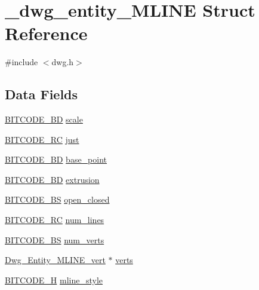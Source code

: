 \hypertarget{struct__dwg__entity__MLINE}{\section{\-\_\-dwg\-\_\-entity\-\_\-\-M\-L\-I\-N\-E \-Struct \-Reference}
\label{struct__dwg__entity__MLINE}
}


{\ttfamily \#include $<$dwg.\-h$>$}

\subsection*{\-Data \-Fields}
\begin{DoxyCompactItemize}
\item 
\hyperlink{dwg_8h_a3c1e6781466b74ba07785d57da70ed97}{\-B\-I\-T\-C\-O\-D\-E\-\_\-\-B\-D} \hyperlink{struct__dwg__entity__MLINE_a971b1dfcf5e832350da4a007ef904452}{scale}
\item 
\hyperlink{dwg_8h_a7fd199a8f9c9cc52bdab220f65a2a619}{\-B\-I\-T\-C\-O\-D\-E\-\_\-\-R\-C} \hyperlink{struct__dwg__entity__MLINE_abd3f0ce020f66391193d840428d8e27d}{just}
\item 
\hyperlink{dwg_8h_a00698ef1bb072aa0a9360c6fc1c57587}{\-B\-I\-T\-C\-O\-D\-E\-\_\-B\-D} \hyperlink{struct__dwg__entity__MLINE_ac2872d0d076c05fa4338e3d0d12509ea}{base\-\_\-point}
\item 
\hyperlink{dwg_8h_a00698ef1bb072aa0a9360c6fc1c57587}{\-B\-I\-T\-C\-O\-D\-E\-\_\-B\-D} \hyperlink{struct__dwg__entity__MLINE_afd74932e322ea9578894967d26bbd5d1}{extrusion}
\item 
\hyperlink{dwg_8h_a94297606fbd4a4ff97e8add284af0809}{\-B\-I\-T\-C\-O\-D\-E\-\_\-\-B\-S} \hyperlink{struct__dwg__entity__MLINE_af20a7d357182b02360f390ec6c3a85e0}{open\-\_\-closed}
\item 
\hyperlink{dwg_8h_a7fd199a8f9c9cc52bdab220f65a2a619}{\-B\-I\-T\-C\-O\-D\-E\-\_\-\-R\-C} \hyperlink{struct__dwg__entity__MLINE_ab17e00b2846f509e02882783cbf11181}{num\-\_\-lines}
\item 
\hyperlink{dwg_8h_a94297606fbd4a4ff97e8add284af0809}{\-B\-I\-T\-C\-O\-D\-E\-\_\-\-B\-S} \hyperlink{struct__dwg__entity__MLINE_a548ce062fc6f2b45bfe3566daa5370d2}{num\-\_\-verts}
\item 
\hyperlink{dwg_8h_a8cb14f839ffdbad125e38f52b435b347}{\-Dwg\-\_\-\-Entity\-\_\-\-M\-L\-I\-N\-E\-\_\-vert} $\ast$ \hyperlink{struct__dwg__entity__MLINE_a7b98ac771f590ff09085ca0f2ac81152}{verts}
\item 
\hyperlink{dwg_8h_a7c700e94e047a97ba8c24bdfe4029dc3}{\-B\-I\-T\-C\-O\-D\-E\-\_\-\-H} \hyperlink{struct__dwg__entity__MLINE_aeba35406ac0060a5475ba0507d2ff07c}{mline\-\_\-style}
\end{DoxyCompactItemize}


